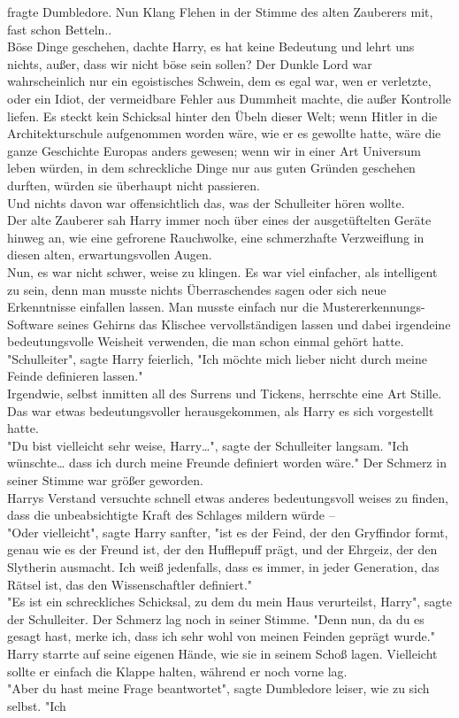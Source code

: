 {fragte Dumbledore. Nun Klang Flehen in der Stimme des alten Zauberers mit, fast schon Betteln..\\ Böse Dinge geschehen, dachte Harry, es hat keine Bedeutung und lehrt uns nichts, außer, dass wir nicht böse sein sollen? Der Dunkle Lord war wahrscheinlich nur ein egoistisches Schwein, dem es egal war, wen er verletzte, oder ein Idiot, der vermeidbare Fehler aus Dummheit machte, die außer Kontrolle liefen. Es steckt kein Schicksal hinter den Übeln dieser Welt; wenn Hitler in die Architekturschule aufgenommen worden wäre, wie er es gewollte hatte, wäre die ganze Geschichte Europas anders gewesen; wenn wir in einer Art Universum leben würden, in dem schreckliche Dinge nur aus guten Gründen geschehen durften, würden sie überhaupt nicht passieren.\\ Und nichts davon war offensichtlich das, was der Schulleiter hören wollte.\\ Der alte Zauberer sah Harry immer noch über eines der ausgetüftelten Geräte hinweg an, wie eine gefrorene Rauchwolke, eine schmerzhafte Verzweiflung in diesen alten, erwartungsvollen Augen.\\ Nun, es war nicht schwer, weise zu klingen. Es war viel einfacher, als intelligent zu sein, denn man musste nichts Überraschendes sagen oder sich neue Erkenntnisse einfallen lassen. Man musste einfach nur die Mustererkennungs-Software seines Gehirns das Klischee vervollständigen lassen und dabei irgendeine bedeutungsvolle Weisheit verwenden, die man schon einmal gehört hatte.\\ "Schulleiter", sagte Harry feierlich, "Ich möchte mich lieber nicht durch meine Feinde definieren lassen."\\ Irgendwie, selbst inmitten all des Surrens und Tickens, herrschte eine Art Stille.\\ Das war etwas bedeutungsvoller herausgekommen, als Harry es sich vorgestellt hatte.\\ "Du bist vielleicht sehr weise, Harry…", sagte der Schulleiter langsam. "Ich wünschte… dass ich durch meine Freunde definiert worden wäre." Der Schmerz in seiner Stimme war größer geworden.\\ Harrys Verstand versuchte schnell etwas anderes bedeutungsvoll weises zu finden, dass die unbeabsichtigte Kraft des Schlages mildern würde --\\ "Oder vielleicht", sagte Harry sanfter, "ist es der Feind, der den Gryffindor formt, genau wie es der Freund ist, der den Hufflepuff prägt, und der Ehrgeiz, der den Slytherin ausmacht. Ich weiß jedenfalls, dass es immer, in jeder Generation, das Rätsel ist, das den Wissenschaftler definiert."\\ "Es ist ein schreckliches Schicksal, zu dem du mein Haus verurteilst, Harry", sagte der Schulleiter. Der Schmerz lag noch in seiner Stimme. "Denn nun, da du es gesagt hast, merke ich, dass ich sehr wohl von meinen Feinden geprägt wurde."\\ Harry starrte auf seine eigenen Hände, wie sie in seinem Schoß lagen. Vielleicht sollte er einfach die Klappe halten, während er noch vorne lag.\\ "Aber du hast meine Frage beantwortet", sagte Dumbledore leiser, wie zu sich selbst. "Ich }
